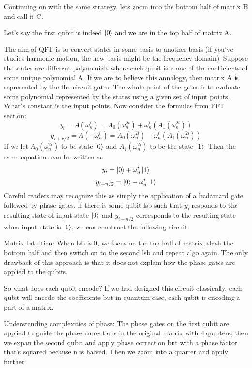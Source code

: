 \documentclass{article}
\newcommand{\om}{\omega_n}
\begin{document}
    Continuing on with the same strategy, lets zoom into the bottom half of matrix
    B and call it C.

    Let's say the first qubit is indeed \(\ket{0}\) and we are in the top half of matrix A.





    The aim of QFT is to convert states in some basis to another basis (if you've studies
    harmonic motion, the new basis might be the frequency domain). Suppose the states are
    different polynomials where each qubit is a one of the coefficients of some unique
    polynomial A. If we are to believe this annalogy, then matrix A is represented by the
    the circuit gates. The whole point of the gates is to evaluate some polynomial represented
    by the states using a given set of input points. What's constant is the input points.
    Now consider the formulas from FFT section:
    \[ y_{i} = A(\om^{i}) = A_0(\om^{2i}) +\om^i(A_1(\om^{2i})) \]
    \[ y_{i+n/2}= A(-\om^{i}) = A_0(\om^{2i}) -\om^i(A_1(\om^{2i})) \]
    If we let \(A_0(\om^{2i})\) to be state \(\ket{0}\) and \(A_1(\om^{2i})\) to
    be the state \(\ket{1}\). Then the same equations can be written as
    \[ y_{i} = \ket{0} +\om^i\ket{1} \]
    \[ y_{i+n/2} = \ket{0} -\om^i\ket{1} \]
    Careful readers may recognize this as simply the application of a hadamard gate followed
    by phase gates. If there is some qubit lsb such that \(y_{i}\) responds to the resulting
    state of input state \(\ket{0}\) and \(y_{i+n/2}\) corresponds to the resulting state
    when input state is \(\ket{1}\), we can construct the following circuit

    Matrix Intuition: When lsb is 0, we focus on the top half of matrix, slash
    the bottom half and then switch on to the second lsb and repeat algo again.
    The only drawback of this approach is that it does not explain how the phase
    gates are applied to the qubits.

    So what does each qubit encode? If we had designed this circuit classically, each qubit will encode
    the coefficients but in quantum case, each qubit is encoding a part of a matrix.

    Understanding complexities of phase: The phase gates on the first qubit are applied
    to guide the phase corrections in the original matrix with 4 quarters,
    then we expan the second qubit and apply phase correction but with a phase
    factor that's squared because n is halved. Then we zoom into a quarter and apply
    further
    \fi

\end{document}
